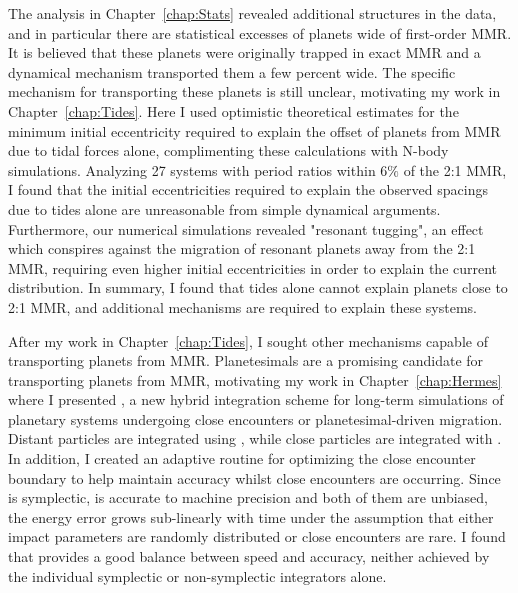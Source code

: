 The analysis in Chapter~\ref{chap:Stats} revealed additional structures in the \kep data, and in particular there are statistical excesses of planets wide of first-order MMR.
It is believed that these planets were originally trapped in exact MMR and a dynamical mechanism transported them a few percent wide.
The specific mechanism for transporting these planets is still unclear, motivating my work in Chapter~\ref{chap:Tides}.
Here I used optimistic theoretical estimates for the minimum initial eccentricity required to explain the offset of \kep planets from MMR due to tidal forces alone, complimenting these calculations with N-body simulations.
Analyzing 27 \kep systems with period ratios within $6\%$ of the 2:1 MMR, I found that the initial eccentricities required to explain the observed spacings due to tides alone are unreasonable from simple dynamical arguments.
Furthermore, our numerical simulations revealed "resonant tugging", an effect which conspires against the migration of resonant planets away from the 2:1 MMR, requiring even higher initial eccentricities in order to explain the current \kep distribution. 
In summary, I found that tides alone cannot explain planets close to 2:1 MMR, and additional mechanisms are required to explain these systems. 

After my work in Chapter~\ref{chap:Tides}, I sought other mechanisms capable of transporting planets from MMR. 
Planetesimals are a promising candidate for transporting planets from MMR, motivating my work in Chapter~\ref{chap:Hermes} where I presented \hermes, a new hybrid integration scheme for long-term simulations of planetary systems undergoing close encounters or planetesimal-driven migration. 
Distant particles are integrated using \whfast, while close particles are integrated with \ias.
In addition, I created an adaptive routine for optimizing the close encounter boundary to help maintain accuracy whilst close encounters are occurring.
Since \whfast is symplectic, \ias is accurate to machine precision and both of them are unbiased, the energy error grows sub-linearly with time under the assumption that either impact parameters are randomly distributed or close encounters are rare.
I found that \hermes provides a good balance between speed and accuracy, neither achieved by the individual symplectic or non-symplectic integrators alone.

